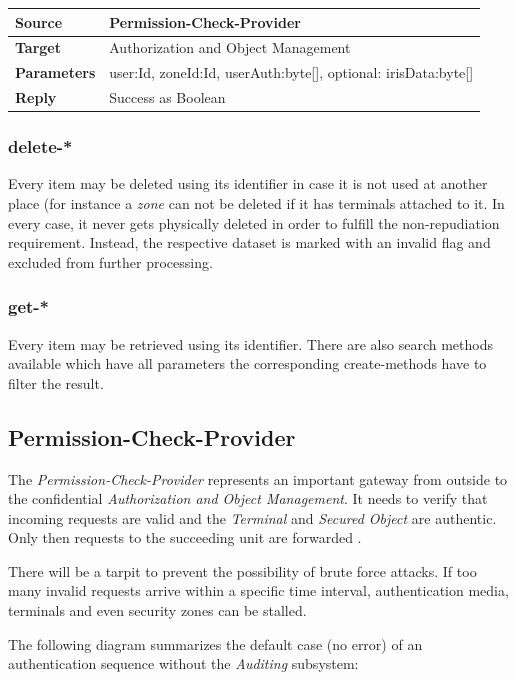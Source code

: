 \documentclass[12pt,a4paper,titlepage,oneside]{scrartcl}
\begin{document}
\begin{table}[h]
    \centering
    \begin{tabular}{|l|p{12cm}|} \hline
    \textbf{Source}&Permission-Check-Provider\\ \hline
    \textbf{Target}&Authorization and Object Management\\ \hline
    \textbf{Parameters}& user:Id, zoneId:Id, userAuth:byte[], optional: irisData:byte[]\\ \hline
    \textbf{Reply}&Success as Boolean\\ \hline
    \end{tabular}
\end{table}

\subsubsection{delete-*}
Every item may be deleted using its identifier in case it is not used at another place (for instance a \emph{zone} can not be deleted if it has terminals attached to it. In every case, it never gets physically deleted in order to fulfill the non-repudiation requirement. Instead, the respective dataset is marked with an invalid flag and excluded from further processing.

\subsubsection{get-*}
Every item may be retrieved using its identifier. There are also search methods available which have all parameters the corresponding create-methods have to filter the result.

\subsection{Permission-Check-Provider}
The \emph{Permission-Check-Provider} represents an important gateway from outside to the confidential \emph{Authorization and Object Management}. It needs to verify that incoming requests are valid and the \emph{Terminal} and \emph{Secured Object} are authentic. Only then requests to the succeeding unit are forwarded .

There will be a tarpit to prevent the possibility of brute force attacks. If too many invalid requests arrive within a specific time interval, authentication media, terminals and even security zones can be stalled.

The following diagram summarizes the default case (no error) of an authentication sequence without the \emph{Auditing} subsystem:
\end{document}
